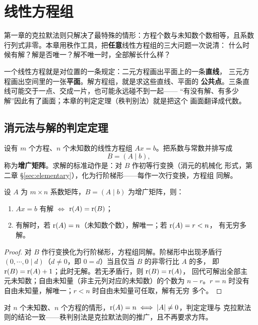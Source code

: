 \chapter{线性方程组}

第一章的克拉默法则只解决了最特殊的情形：方程个数与未知数个数相等，且系数
行列式非零。本章用秩作工具，把\textbf{任意}线性方程组的三大问题一次说清：
什么时候有解？解是否唯一？解不唯一时，全部解长什么样？

\begin{insight}[观点：方程 = 约束，解方程组 = 求交集]
一个线性方程就是对位置的一条规定：二元方程画出平面上的一条\textbf{直线}，
三元方程画出空间里的一张\textbf{平面}。解方程组，就是求这些直线、平面的
\textbf{公共点}。三条直线可能交于一点、交成一片，也可能永远碰不到一起——
“有没有解、有多少解”因此有了画面；本章的判定定理（秩判别法）就是把这个
画面翻译成代数。
\end{insight}

\section{消元法与解的判定定理}\label{sec:elimination}

设有 $m$ 个方程、$n$ 个未知数的线性方程组 $Ax=b$。把系数与常数并排写成
\[
  B=(A\mid b),
\]
称为\textbf{增广矩阵}。求解的标准动作是：对 $B$ 作初等行变换（消元的机械化
形式，第二章 \S\ref{sec:elementary}），化为行阶梯形——每作一次行变换，方程组
同解。

\begin{theorem}[解的判定定理]\label{thm:solvability}
设 $A$ 为 $m\times n$ 系数矩阵，$B=(A\mid b)$ 为增广矩阵，则：
\begin{enumerate}[label=(\arabic*), itemsep=0pt]
  \item $Ax=b$ 有解 $\iff$ $\operatorname{r}(A)=\operatorname{r}(B)$；
  \item 有解时，若 $\operatorname{r}(A)=n$（未知数个数），解唯一；若 $\operatorname{r}(A)=r<n$，
        有无穷多解。
\end{enumerate}
\end{theorem}
\begin{proof}
对 $B$ 作行变换化为行阶梯形，方程组同解。阶梯形中出现矛盾行
$(0,\cdots,0\mid d)$（$d\neq0$，即 $0=d$）当且仅当 $B$ 的非零行比 $A$ 的多，
即 $\operatorname{r}(B)=\operatorname{r}(A)+1$；此时无解。若无矛盾行，则 $\operatorname{r}(B)=\operatorname{r}(A)$，
回代可解出全部主元未知数；自由未知量（非主元列对应的未知数）的个数为
$n-r$。$r=n$ 时没有自由未知量，解唯一；$r<n$ 时自由未知量可任取，解有无穷
多个。
\end{proof}

对 $n$ 个未知数、$n$ 个方程的情形，$\operatorname{r}(A)=n\iff|A|\neq0$，判定定理与
克拉默法则的结论一致——秩判别法是克拉默法则的推广，且不再要求方阵。

